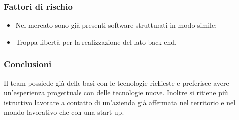 		\subsubsection{Fattori di rischio}
		\begin{itemize}
			\item Nel mercato sono già presenti software strutturati in modo simile;
			\item Troppa libertà per la realizzazione del lato back-end.
		\end{itemize}
		\subsubsection{Conclusioni}
		Il team possiede già delle basi con le tecnologie richieste e preferisce avere un'esperienza progettuale con delle tecnologie nuove. Inoltre si ritiene più istruttivo lavorare a contatto di un'azienda già affermata nel territorio e nel mondo lavorativo che con una start-up.
	
	